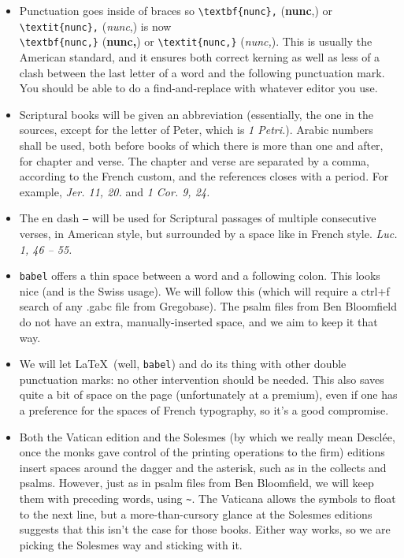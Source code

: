 \documentclass[11pt]{article}
\begin{document}
\begin{itemize}
\item
 Punctuation goes inside of braces so \verb|\textbf{nunc},| (\textbf{nunc},) or \verb|\textit{nunc},| (\textit{nunc},) is now\\ \verb|\textbf{nunc,}| (\textbf{nunc,}) or \verb|\textit{nunc,}| (\textit{nunc,}). This is usually the American standard, and it ensures both correct kerning as well as less of a clash between the last letter of a word and the following punctuation mark. You should be able to do a find-and-replace with whatever editor you use.
 \item
Scriptural books will be given an abbreviation (essentially, the one in the sources, except for the letter of Peter, which is \textit{1 Petri.}). Arabic numbers shall be used, both before books of which there is more than one and after, for chapter and verse. The chapter and verse are separated by a comma, according to the French custom, and the references closes with a period.
 For example, \hspace{0.05em}\textit{Jer. 11, 20.} and \textit{1 Cor. 9, 24.}
 \item
The en dash \verb|–| will be used for Scriptural passages of multiple consecutive verses, in American style, but surrounded by a space like in French style. \textit{Luc. 1, 46 – 55.}
\item
\verb|babel| offers a thin space between a word and a following colon. This looks nice (and is the Swiss usage). We will follow this (which will require a ctrl+f search of any .gabc file from Gregobase). The psalm files from Ben Bloomfield do not have an extra, manually-inserted space, and we aim to keep it that way.
\item
We will let \LaTeX\ (well, \verb|babel|) and do its thing with other double punctuation marks: no other intervention should be needed. This also saves quite a bit of space on the page (unfortunately at a premium), even if one has a preference for the spaces of French typography, so it's a good compromise.
\item
Both the Vatican edition and the Solesmes (by which we really mean Desclée, once the monks gave control of the printing operations to the firm) editions insert spaces around the dagger and the asterisk, such as in the collects and psalms. However, just as in psalm files from Ben Bloomfield, we will keep them with preceding words, using \verb|~|. The Vaticana allows the symbols to float to the next line, but  a more-than-cursory glance at the Solesmes editions suggests that this isn't the case for those books. Either way works, so we are picking the Solesmes way and sticking with it.

\end{itemize}
\end{document}
